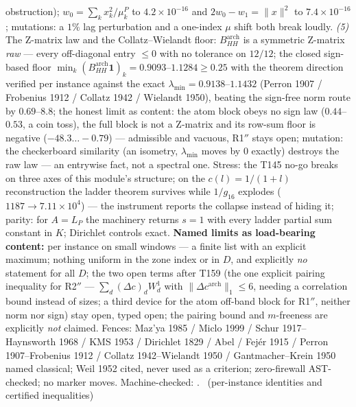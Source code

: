 \documentclass[11pt,a4paper]{article}
\begin{document}
obstruction); $w_0=\sum_kx_k^2/\mu^P_k$ to $4.2\times10^{-16}$ and
$2w_0-w_1=\|x\|^2$ to $7.4\times10^{-16}$; mutations: a $1\%$ lag
perturbation and a one-index $\mu$ shift both break loudly. \emph{(5)}
The Z-matrix law and the Collatz--Wielandt floor:
$B^{\mathrm{arch}}_{HH}$ is a symmetric Z-matrix \emph{raw} --- every
off-diagonal entry $\le0$ with no tolerance on $12/12$; the closed
sign-based floor $\min_k(B^{\mathrm{arch}}_{HH}\mathbf 1)_k=
0.9093$--$1.1284\ge0.25$ with the theorem direction verified per
instance against the exact $\lambda_{\min}=0.9138$--$1.1432$ (Perron
1907 / Frobenius 1912 / Collatz 1942 / Wielandt 1950), beating the
sign-free norm route by $0.69$--$8.8$; the honest limit as content: the
atom block obeys no sign law ($0.44$--$0.53$, a coin toss), the full
block is not a Z-matrix and its row-sum floor is negative
($-48.3\ldots-0.79$) --- admissible and vacuous, R1$''$ stays open;
mutation: the checkerboard similarity (an isometry, $\lambda_{\min}$
moves by $0$ exactly) destroys the raw law --- an entrywise fact, not a
spectral one. Stress: the T145 no-go breaks on three axes of this
module's structure; on the $c(l)=1/(1+l)$ reconstruction the ladder
theorem survives while $1/g_{16}$ explodes ($1187\to7.11\times10^{4}$)
--- the instrument reports the collapse instead of hiding it; parity:
for $A=L_P$ the machinery returns $s=1$ with every ladder partial sum
constant in $K$; Dirichlet controls exact.
\textbf{Named limits as load-bearing content:} per instance on small
windows --- a finite list with an explicit maximum; nothing uniform in
the zone index or in $D$, and explicitly \emph{no} statement for all
$D$; the two open terms after T159 (the one explicit pairing inequality
for R2$''$ --- $\sum_d(\Delta c)_dW^1_d$ with $\|\Delta c^{\mathrm{arch}}
\|_1\le6$, needing a correlation bound instead of sizes; a third device
for the atom off-band block for R1$''$, neither norm nor sign) stay
open, typed open; the pairing bound and $m$-freeness are explicitly
\emph{not} claimed. Fences: Maz'ya 1985 / Miclo 1999 / Schur
1917--Haynsworth 1968 / KMS 1953 / Dirichlet 1829 / Abel / Fej\'er 1915
/ Perron 1907--Frobenius 1912 / Collatz 1942--Wielandt 1950 /
Gantmacher--Krein 1950 named classical; Weil 1952 cited, never used as a
criterion; zero-firewall AST-checked; no marker moves.
Machine-checked: .
\mE\ (per-instance identities and certified inequalities)
\end{document}
